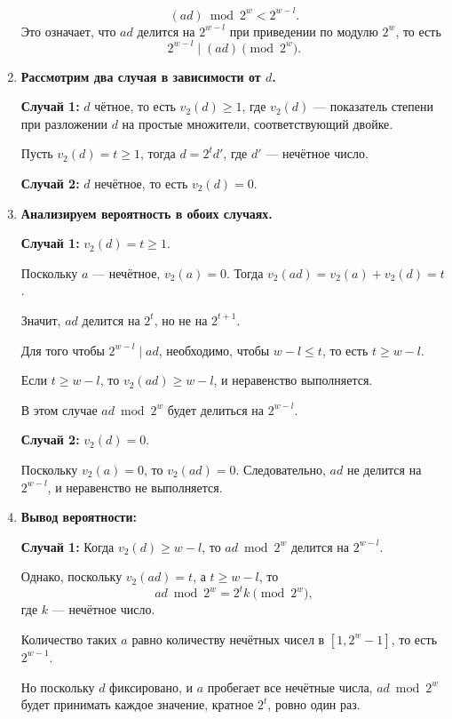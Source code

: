 \documentclass[11pt]{article}
\renewcommand{\le}{\leqslant}   %
\renewcommand{\ge}{\geqslant}   %
\begin{document}
\begin{solution}
\begin{enumerate}
          \[
              (a d) \bmod 2^w < 2^{w - l}.
          \]
          Это означает, что $a d$ делится на $2^{w - l}$ при приведении по модулю $2^w$, то есть
          \[
              2^{w - l} \mid (a d) \pmod{2^w}.
          \]

    \item \textbf{Рассмотрим два случая в зависимости от $d$.}

          \textbf{Случай 1:} $d$ чётное, то есть $v_2(d) \ge 1$, где $v_2(d)$ — показатель степени при разложении $d$ на простые множители, соответствующий двойке.

          Пусть $v_2(d) = t \ge 1$, тогда $d = 2^t d'$, где $d'$ — нечётное число.

          \textbf{Случай 2:} $d$ нечётное, то есть $v_2(d) = 0$.

    \item \textbf{Анализируем вероятность в обоих случаях.}

          \textbf{Случай 1:} $v_2(d) = t \ge 1$.

          Поскольку $a$ — нечётное, $v_2(a) = 0$. Тогда $v_2(a d) = v_2(a) + v_2(d) = t$.

          Значит, $a d$ делится на $2^t$, но не на $2^{t + 1}$.

          Для того чтобы $2^{w - l} \mid a d$, необходимо, чтобы $w - l \le t$, то есть $t \ge w - l$.

          Если $t \ge w - l$, то $v_2(a d) \ge w - l$, и неравенство выполняется.

          В этом случае $a d \bmod 2^w$ будет делиться на $2^{w - l}$.

          \textbf{Случай 2:} $v_2(d) = 0$.

          Поскольку $v_2(a) = 0$, то $v_2(a d) = 0$. Следовательно, $a d$ не делится на $2^{w - l}$, и неравенство не выполняется.

    \item \textbf{Вывод вероятности:}

          \textbf{Случай 1:} Когда $v_2(d) \ge w - l$, то $a d \bmod 2^w$ делится на $2^{w - l}$.

          Однако, поскольку $v_2(a d) = t$, а $t \ge w - l$, то
          \[
              a d \bmod 2^w = 2^{t} k \pmod{2^w},
          \]
          где $k$ — нечётное число.

          Количество таких $a$ равно количеству нечётных чисел в $[1, 2^w - 1]$, то есть $2^{w - 1}$.

          Но поскольку $d$ фиксировано, и $a$ пробегает все нечётные числа, $a d \bmod 2^w$ будет принимать каждое значение, кратное $2^{t}$, ровно один раз.


\end{enumerate}
\end{solution}
\end{document}
